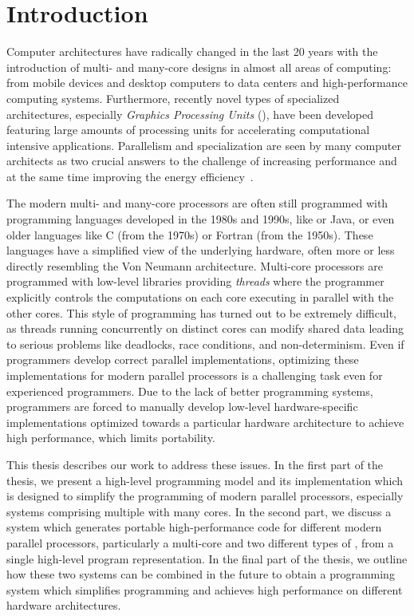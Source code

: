 
\chapter{Introduction} %

\label{ch:introduction} %

Computer architectures have radically changed in the last 20 years with the introduction of multi- and many-core designs in almost all areas of computing:
from mobile devices and desktop computers to data centers and high-performance computing systems.
Furthermore, recently novel types of specialized architectures, especially \emph{Graphics Processing Units} (\GPUs), have been developed featuring large amounts of processing units for accelerating computational intensive applications.
Parallelism and specialization are seen by many computer architects as two crucial answers to the challenge of increasing performance and at the same time improving the energy efficiency~\cite{}.

The modern multi- and many-core processors are often still programmed with programming languages developed in the 1980s and 1990s, like \Cpp or Java, or even older languages like C (from the 1970s) or Fortran (from the 1950s).
These languages have a simplified view of the underlying hardware, often more or less directly resembling the Von Neumann architecture.
Multi-core processors are programmed with low-level libraries providing \emph{threads} where the programmer explicitly controls the computations on each core executing in parallel with the other cores.
This style of programming has turned out to be extremely difficult, as threads running concurrently on distinct cores can modify shared data leading to serious problems like deadlocks, race conditions, and non-determinism.
Even if programmers develop correct parallel implementations, optimizing these implementations for modern parallel processors is a challenging task even for experienced programmers.
Due to the lack of better programming systems, programmers are forced to manually develop low-level hardware-specific implementations optimized towards a particular hardware architecture to achieve high performance, which limits portability.

This thesis describes our work to address these issues.
In the first part of the thesis, we present a high-level programming model and its implementation which is designed to simplify the programming of modern parallel processors, especially systems comprising multiple \GPUs with many cores.
In the second part, we discuss a system which generates portable high-performance code for different modern parallel processors, particularly a multi-core \CPU and two different types of \GPUs, from a single high-level program representation.
In the final part of the thesis, we outline how these two systems can be combined in the future to obtain a programming system which simplifies programming and achieves high performance on different hardware architectures.


